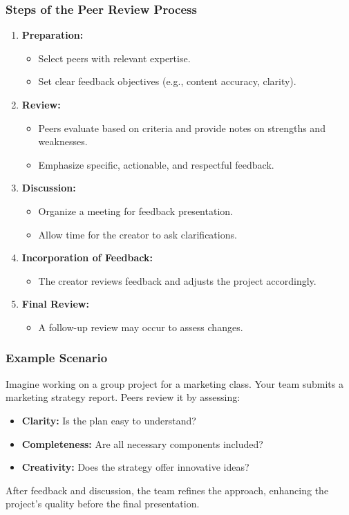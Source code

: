 \documentclass[aspectratio=169]{beamer}
\begin{document}
\begin{frame}[fragile]
  \frametitle{Steps of the Peer Review Process}
  \begin{enumerate}
    \item \textbf{Preparation:}
      \begin{itemize}
        \item Select peers with relevant expertise.
        \item Set clear feedback objectives (e.g., content accuracy, clarity).
      \end{itemize}
    \item \textbf{Review:}
      \begin{itemize}
        \item Peers evaluate based on criteria and provide notes on strengths and weaknesses.
        \item Emphasize specific, actionable, and respectful feedback.
      \end{itemize}
    \item \textbf{Discussion:}
      \begin{itemize}
        \item Organize a meeting for feedback presentation.
        \item Allow time for the creator to ask clarifications.
      \end{itemize}
    \item \textbf{Incorporation of Feedback:}
      \begin{itemize}
        \item The creator reviews feedback and adjusts the project accordingly.
      \end{itemize}
    \item \textbf{Final Review:}
      \begin{itemize}
        \item A follow-up review may occur to assess changes.
      \end{itemize}
  \end{enumerate}
\end{frame}

\begin{frame}[fragile]
  \frametitle{Example Scenario}
  Imagine working on a group project for a marketing class. Your team submits a marketing strategy report. Peers review it by assessing:
  \begin{itemize}
    \item \textbf{Clarity:} Is the plan easy to understand?
    \item \textbf{Completeness:} Are all necessary components included?
    \item \textbf{Creativity:} Does the strategy offer innovative ideas?
  \end{itemize}
  After feedback and discussion, the team refines the approach, enhancing the project's quality before the final presentation.
\end{frame}
\end{document}
